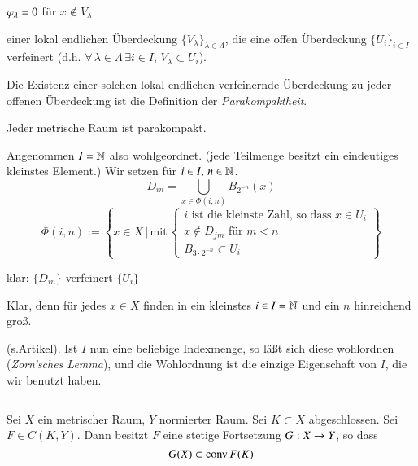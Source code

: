 \begin{description}
\begin{itemize}
            $\varphi_\lambda=0$ für $x\nin V_\lambda$.
        \end{itemize}
        \item[„Konstruktion“] einer lokal endlichen Überdeckung $\{V_\lambda\}_{\lambda\in\Lambda}$, die
        eine offen Überdeckung $\{U_i\}_{i\in I}$ verfeinert (d.h. $\forall \, \lambda\in \Lambda \, 
        \exists i \in I, \, V_\lambda\subset U_i$).
        \item{Die Existenz} einer solchen lokal endlichen verfeinernde Überdeckung zu jeder offenen
        Überdeckung ist die Definition der \textit{Parakompaktheit}.
        \begin{theorem*}
                    Jeder metrische Raum ist parakompakt.
        \end{theorem*}

        \begin{idea}
        Angenommen $I=\mathbb{N}$ also wohlgeordnet. (jede Teilmenge besitzt ein eindeutiges kleinstes Element.)
        Wir setzen für $i\in I, \, n\in \mathbb{N}$.
        \[
            D_{in}=\bigcup_{x\in \Phi(i,n)} B_{2^{-n}}(x)
        \]
        \[
            \Phi(i,n):=\left\{x\in X \, \Big| \, \text{mit}\, \begin{cases}\text{$i$ ist die kleinste
            Zahl, so dass $x\in U_i$}\\ \text{$x\nin D_{jm}$ für $m<n$}\\ B_{3\cdot2^{-n}}\subset U_i  
            \end{cases}\right\}
        \]
        \begin{description}
        \item klar: $\{ D_{in} \}$ verfeinert $\{U_i\}$
        \item[Überdeckung:] Klar, denn für jedes $x\in X$ finden in ein kleinstes $i\in I=\mathbb{N}$ und ein
        $n$ hinreichend groß.
        \item[lokale Endlichkeit:] (s.Artikel).
        Ist $I$ nun eine beliebige Indexmenge, so läßt sich diese wohlordnen (\textit{Zorn'sches Lemma}),
        und die Wohlordnung ist die einzige Eigenschaft von $I$, die wir benutzt haben.
        \end{description}
        \[ \]
        \end{idea}
    \end{description}
\begin{theorem}\label{2.12}
    Sei $X$ ein metrischer Raum, $Y$ normierter Raum. Sei $K\subset X$ abgeschlossen. Sei $F\in C(K,Y)$.
    Dann besitzt $F$ eine stetige Fortsetzung $G:X\rightarrow Y$, so dass
    \[
        G(X)\subset\mathrm{conv}\, F(K)
    \]
\end{theorem}

